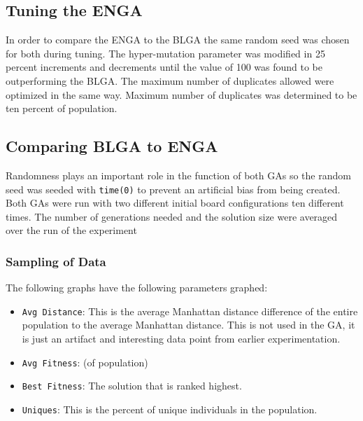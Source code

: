 \documentclass[]{article}
\begin{document}
\subsection{Tuning the ENGA}\label{tuning-the-enga}

In order to compare the ENGA to the BLGA the same random seed was chosen
for both during tuning. The hyper-mutation parameter was modified in 25
percent increments and decrements until the value of 100 was found to be
outperforming the BLGA. The maximum number of duplicates allowed were
optimized in the same way. Maximum number of duplicates was determined
to be ten percent of population.

\subsection{Comparing BLGA to ENGA}\label{comparing-blga-to-enga}

Randomness plays an important role in the function of both GAs so the
random seed was seeded with \texttt{time(0)} to prevent an artificial
bias from being created. Both GAs were run with two different initial
board configurations ten different times. The number of generations
needed and the solution size were averaged over the run of the
experiment

\subsubsection{Sampling of Data}\label{sampling-of-data}

The following graphs have the following parameters graphed:

\begin{itemize}
\itemsep1pt\parskip0pt
\item
  \texttt{Avg Distance}: This is the average Manhattan distance
  difference of the entire population to the average Manhattan distance.
  This is not used in the GA, it is just an artifact and interesting
  data point from earlier experimentation.
\item
  \texttt{Avg Fitness}: (of population)
\item
  \texttt{Best Fitness}: The solution that is ranked highest.
\item
  \texttt{Uniques}: This is the percent of unique individuals in the
  population.
\end{itemize}
\end{document}
